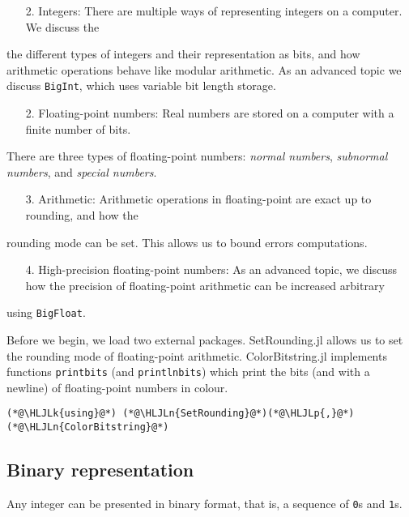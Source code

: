 \documentclass[12pt,a4paper]{article}
\newcommand{\HLJLk}[1]{\textcolor[RGB]{148,91,176}{\textbf{#1}}}
\newcommand{\HLJLn}[1]{#1}
\newcommand{\HLJLp}[1]{#1}
\begin{document}
\begin{itemize}
\item[2. ] Integers:  There are multiple ways of representing integers on a computer. We discuss the

\end{itemize}
the different types of integers and their representation as bits, and how arithmetic operations behave like modular arithmetic. As an advanced topic we discuss \texttt{BigInt}, which uses variable bit length storage.

\begin{itemize}
\item[2. ] Floating-point numbers: Real numbers are stored on a computer with a finite number of bits.

\end{itemize}
There are three types of floating-point numbers: \emph{normal numbers}, \emph{subnormal numbers}, and \emph{special numbers}.

\begin{itemize}
\item[3. ] Arithmetic: Arithmetic operations in floating-point are exact up to rounding, and how the

\end{itemize}
rounding mode can be set. This allows us to bound  errors computations.

\begin{itemize}
\item[4. ] High-precision floating-point numbers: As an advanced topic, we discuss how the precision of floating-point arithmetic can be increased arbitrary

\end{itemize}
using \texttt{BigFloat}.

Before we begin, we load two external packages. SetRounding.jl allows us to set the rounding mode of floating-point arithmetic. ColorBitstring.jl   implements functions \texttt{printbits} (and \texttt{printlnbits}) which print the bits (and with a newline) of floating-point numbers in colour.


\begin{lstlisting}
(*@\HLJLk{using}@*) (*@\HLJLn{SetRounding}@*)(*@\HLJLp{,}@*) (*@\HLJLn{ColorBitstring}@*)
\end{lstlisting}


\subsection{Binary representation}
Any integer can be presented in binary format, that is, a sequence of \texttt{0}s and \texttt{1}s.
\end{document}
